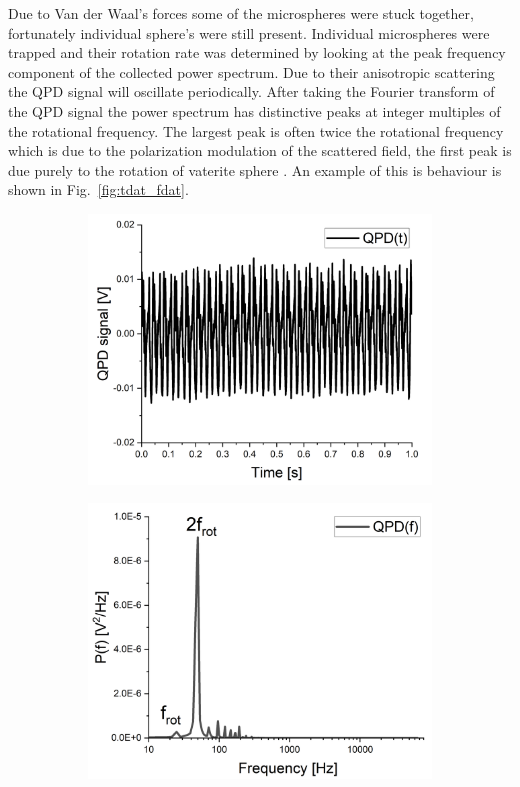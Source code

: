 Due to Van der Waal's forces some of the microspheres were stuck 
together, fortunately individual sphere's were still present. 
Individual microspheres were trapped and their rotation rate was 
determined by looking at the peak frequency component of the 
collected power spectrum. Due to their anisotropic scattering the 
QPD signal will oscillate periodically. After taking the Fourier
transform of the QPD signal the power spectrum has distinctive
peaks at integer multiples of the rotational frequency. The largest 
peak is often twice the rotational frequency which is due to the 
polarization modulation of the scattered field, the first peak 
is due purely to the rotation of vaterite sphere \cite{Monteiro2018}. 
An example of this is behaviour is shown in Fig.~\ref{fig:tdat_fdat}.

\begin{figure}[h!]
	\begin{subfigure}{0.49\linewidth}
		\includegraphics[width=\linewidth]{time_domain_data.png}
	\end{subfigure}
	\begin{subfigure}{0.49\linewidth}
		\includegraphics[width=\linewidth]{frequency_domain_data.png}

\end{subfigure}
\end{figure}

